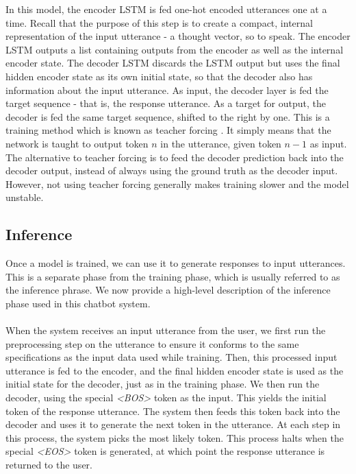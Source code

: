 \documentclass{article}
\begin{document}
In this model, the encoder LSTM is fed one-hot encoded utterances one at a
time. Recall that the purpose of this step is to create a compact, internal
representation of the input utterance - a thought vector, so to speak. The
encoder LSTM outputs a list containing outputs from the encoder as well as the
internal encoder state. The decoder LSTM discards the LSTM output but uses
the final hidden encoder state as its own initial state, so that the decoder
also has information about the input utterance. As input, the decoder layer
is fed the target sequence - that is, the response utterance. As a target for
output, the decoder is fed the same target sequence, shifted to the right
by one. This is a training method which is known as teacher forcing
\cite{teacher-forcing}. It simply means that the network is taught to output
token $n$ in the utterance, given token $n-1$ as input. The alternative to
teacher forcing is to feed the decoder prediction back into the decoder output,
instead of always using the ground truth as the decoder input. However, not
using teacher forcing generally makes training slower and the model unstable.

\subsection*{Inference}

Once a model is trained, we can use it to generate responses to input
utterances. This is a separate phase from the training phase, which is usually
referred to as the inference phrase. We now provide a high-level description
of the inference phase used in this chatbot system.

\paragraph{}
When the system receives an input utterance from the user, we first run the
preprocessing step on the utterance to ensure it conforms to the same
specifications as the input data used while training. Then, this processed
input utterance is fed to the encoder, and the final hidden encoder state is
used as the initial state for the decoder, just as in the training phase. We
then run the decoder, using the special \emph{<BOS>} token as the input. This
yields the initial token of the response utterance. The system then feeds this
token back into the decoder and uses it to generate the next token in the
utterance. At each step in this process, the system picks the most likely
token. This process halts when the special \emph{<EOS>} token is generated,
at which point the response utterance is returned to the user.
\end{document}
